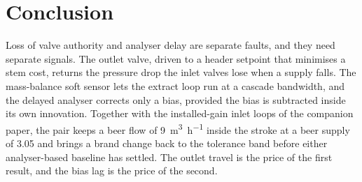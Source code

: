 \documentclass[conference,a4paper]{IEEEtran}
\begin{document}
\section{Conclusion}
Loss of valve authority and analyser delay are separate faults, and they need separate signals. The outlet valve, driven to a header setpoint that minimises a stem cost, returns the pressure drop the inlet valves lose when a supply falls. The mass-balance soft sensor lets the extract loop run at a cascade bandwidth, and the delayed analyser corrects only a bias, provided the bias is subtracted inside its own innovation. Together with the installed-gain inlet loops of the companion paper, the pair keeps a beer flow of \SI{9}{\cubic\metre\per\hour} inside the stroke at a beer supply of \SI{3.05}{\barg} and brings a brand change back to the tolerance band before either analyser-based baseline has settled. The outlet travel is the price of the first result, and the bias lag is the price of the second.



\end{document}
